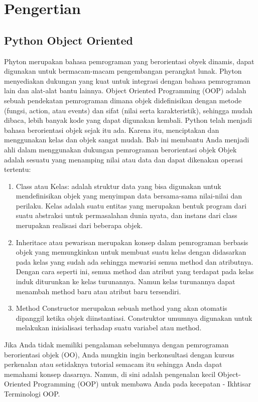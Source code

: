 
\section {Pengertian }
\subsection {Python Object Oriented}
Phyton merupakan bahasa pemrograman yang berorientasi obyek dinamis, dapat digunakan untuk bermacam-macam pengembangan perangkat lunak. Phyton menyediakan dukungan yang kuat untuk integrasi dengan bahasa pemrograman lain dan alat-alat bantu lainnya.
Object Oriented Programming (OOP) adalah sebuah pendekatan pemrograman dimana objek didefinisikan dengan metode (fungsi, action, atau events) dan sifat (nilai serta karakteristik), sehingga mudah dibaca, lebih banyak kode yang dapat digunakan kembali.
Python telah menjadi bahasa berorientasi objek sejak itu ada. Karena itu, menciptakan dan menggunakan kelas dan objek sangat mudah. Bab ini membantu Anda menjadi ahli dalam menggunakan dukungan pemrograman berorientasi objek
Objek adalah sesuatu yang menamping nilai atau data dan dapat dikenakan operasi tertentu:
\begin {enumerate}
\item Class atau Kelas: adalah struktur data yang bisa digunakan untuk mendefinisikan objek yang menyimpan data bersama-sama nilai-nilai dan perilaku. Kelas adalah suatu entitas yang merupakan bentuk program dari suatu abstraksi untuk permasalahan dunia nyata, dan instans dari class merupakan realisasi dari beberapa objek.
\item Inheritace atau pewarisan merupakan konsep dalam pemrograman berbasis objek yang memungkinkan untuk membuat suatu kelas dengan didasarkan pada kelas yang sudah ada sehingga mewarisi semua method dan atributnya. Dengan cara seperti ini, semua method dan atribut yang terdapat pada kelas induk diturunkan ke kelas turunannya. Namun kelas turunannya dapat menambah method baru atau atribut baru tersendiri.
\item Method Constructor merupakan sebuah method yang akan otomatis dipanggil ketika objek diinstantiasi. Construktor umumnya digunakan untuk melakukan inisialisasi terhadap suatu variabel atau method.
\end {enumerate}
Jika Anda tidak memiliki pengalaman sebelumnya dengan pemrograman berorientasi objek (OO), Anda mungkin  ingin berkonsultasi dengan kursus perkenalan atau setidaknya tutorial semacam itu sehingga Anda dapat memahami konsep dasarnya. Namun, di sini adalah pengenalan kecil Object-Oriented Programming (OOP) untuk membawa Anda pada kecepatan - Ikhtisar Terminologi OOP.

